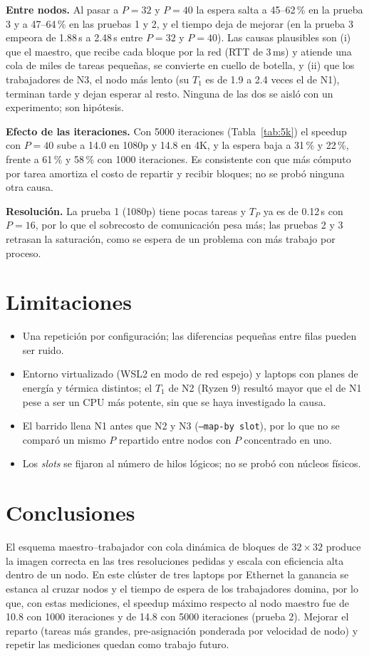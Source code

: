 \documentclass[runningheads]{llncs}
\begin{document}
\textbf{Entre nodos.} Al pasar a $P=32$ y $P=40$ la espera salta a 45--62\,\% en la prueba 3 y a 47--64\,\% en las
pruebas 1 y 2, y el tiempo deja de mejorar (en la prueba 3 empeora de 1.88\,s a 2.48\,s entre $P=32$ y $P=40$). Las causas
plausibles son (i) que el maestro, que recibe cada bloque por la red (RTT de 3\,ms) y atiende una cola de miles de tareas
peque\~nas, se convierte en cuello de botella, y (ii) que los trabajadores de N3, el nodo m\'as lento (su $T_1$ es de 1.9 a
2.4 veces el de N1), terminan tarde y dejan esperar al resto. Ninguna de las dos se aisl\'o con un experimento; son hip\'otesis.

\textbf{Efecto de las iteraciones.} Con 5000 iteraciones (Tabla~\ref{tab:5k}) el speedup con $P=40$ sube a 14.0 en 1080p y 14.8 en 4K,
y la espera baja a 31\,\% y 22\,\%, frente a 61\,\% y 58\,\% con 1000 iteraciones. Es consistente con que m\'as c\'omputo por tarea
amortiza el costo de repartir y recibir bloques; no se prob\'o ninguna otra causa.

\textbf{Resoluci\'on.} La prueba 1 (1080p) tiene pocas tareas y $T_P$ ya es de 0.12\,s con $P=16$, por lo que el
sobrecosto de comunicaci\'on pesa m\'as; las pruebas 2 y 3 retrasan la saturaci\'on, como se espera de un problema
con m\'as trabajo por proceso.

\section{Limitaciones}
\begin{itemize}
\item Una repetici\'on por configuraci\'on; las diferencias peque\~nas entre filas pueden ser ruido.
\item Entorno virtualizado (WSL2 en modo de red espejo) y laptops con planes de energ\'ia y t\'ermica distintos; el $T_1$ de
N2 (Ryzen 9) result\'o mayor que el de N1 pese a ser un CPU m\'as potente, sin que se haya investigado la causa.
\item El barrido llena N1 antes que N2 y N3 (\texttt{--map-by slot}), por lo que no se compar\'o un mismo $P$
repartido entre nodos con $P$ concentrado en uno.
\item Los \emph{slots} se fijaron al n\'umero de hilos l\'ogicos; no se prob\'o con n\'ucleos f\'isicos.
\end{itemize}

\section{Conclusiones}
El esquema maestro--trabajador con cola din\'amica de bloques de $32\times32$ produce la imagen correcta en las tres
resoluciones pedidas y escala con eficiencia alta dentro de un nodo. En este cl\'uster de tres laptops por Ethernet la
ganancia se estanca al cruzar nodos y el tiempo de espera de los trabajadores domina, por lo que, con estas mediciones,
el speedup m\'aximo respecto al nodo maestro fue de 10.8 con 1000 iteraciones y de 14.8 con 5000 iteraciones (prueba 2). Mejorar el reparto (tareas m\'as grandes, pre-asignaci\'on
ponderada por velocidad de nodo) y repetir las mediciones quedan como trabajo futuro.
\end{document}
